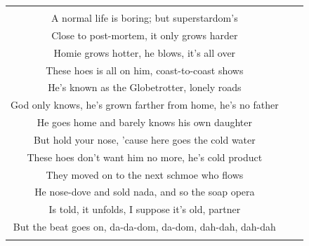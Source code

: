 \begin{table}[p]
\begin{center}
\begin{tabular}{|c|c p{11.3cm}|}
{{        As we move toward a New World Order \\
        A normal life is boring; but superstardom's \\
        Close to post-mortem, it only grows harder \\
        Homie grows hotter, he blows, it's all over \\
        These hoes is all on him, coast-to-coast shows \\
        He's known as the Globetrotter, lonely roads \\
        God only knows, he's grown farther from home, he's no father \\
        He goes home and barely knows his own daughter \\
        But hold your nose, 'cause here goes the cold water \\
        These hoes don't want him no more, he's cold product \\
        They moved on to the next schmoe who flows \\
        He nose-dove and sold nada, and so the soap opera \\
        Is told, it unfolds, I suppose it's old, partner \\
        But the beat goes on, da-da-dom, da-dom, dah-dah, dah-dah \\
        }} \\\hline
    \end{tabular}
    \egroup
    \end{center}
\end{table}

